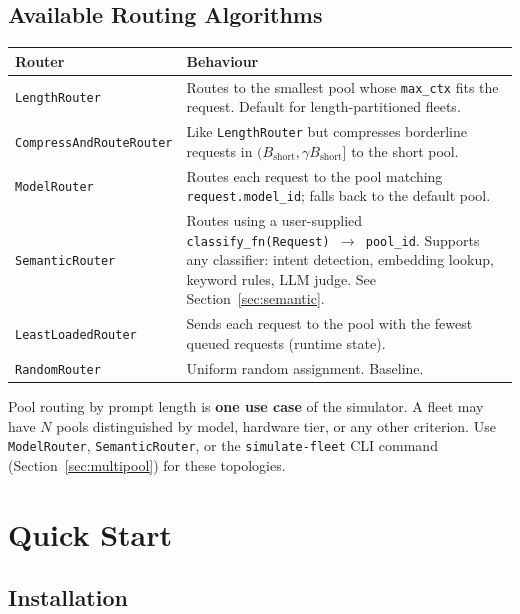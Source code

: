 \documentclass[11pt,a4paper]{article}
\newcommand{\Bshort}{B_{\text{short}}}
\begin{document}
\subsection{Available Routing Algorithms}
\label{sec:routing}

\begin{center}
\begin{tabular}{lp{9cm}}
\toprule
Router & Behaviour \\
\midrule
\texttt{LengthRouter} & Routes to the smallest pool whose \texttt{max\_ctx}
  fits the request.  Default for length-partitioned fleets. \\
\texttt{CompressAndRouteRouter} & Like \texttt{LengthRouter} but compresses
  borderline requests in $(\Bshort, \gamma\Bshort]$ to the short pool. \\
\texttt{ModelRouter} & Routes each request to the pool matching
  \texttt{request.model\_id}; falls back to the default pool. \\
\texttt{SemanticRouter} & Routes using a user-supplied
  \texttt{classify\_fn(Request) $\to$ pool\_id}.  Supports any
  classifier: intent detection, embedding lookup, keyword rules, LLM
  judge.  See Section~\ref{sec:semantic}. \\
\texttt{LeastLoadedRouter} & Sends each request to the pool with the
  fewest queued requests (runtime state). \\
\texttt{RandomRouter} & Uniform random assignment.  Baseline. \\
\bottomrule
\end{tabular}
\end{center}

\begin{keyinsight}
  Pool routing by prompt length is \textbf{one use case} of the
  simulator.  A fleet may have $N$ pools distinguished by model,
  hardware tier, or any other criterion.  Use \texttt{ModelRouter},
  \texttt{SemanticRouter}, or the \texttt{simulate-fleet} CLI command
  (Section~\ref{sec:multipool}) for these topologies.
\end{keyinsight}

\section{Quick Start}
\label{sec:quickstart}

\subsection{Installation}
\end{document}
